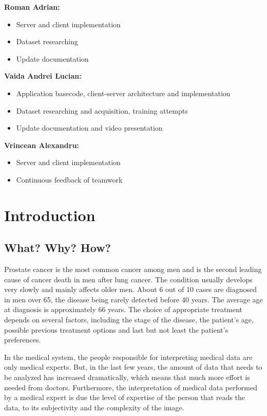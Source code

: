 \documentclass[runningheads,a4paper,11pt]{report}
\begin{document}
\textbf{Roman Adrian:}
\begin{itemize}
	\item Server and client implementation
	\item Dataset researching
	\item Update documentation
\end{itemize}

\textbf{Vaida Andrei Lucian:}
\begin{itemize}
	\item Application basecode, client-server architecture and implementation
	\item Dataset researching and acquisition, training attempts
	\item Update documentation and video presentation
\end{itemize}

\textbf{Vrincean Alexandru:}
\begin{itemize}
	\item Server and client implementation
	\item Continuous feedback of teamwork
\end{itemize}

\newpage



\chapter{Introduction}
\label{chapter:introduction}

\section{What? Why? How?}
\label{section:what}

Prostate cancer is the most common cancer among men and is the second leading cause of cancer death in men after lung cancer. The condition usually develops very slowly and mainly affects older men. About 6 out of 10 cases are diagnosed in men over 65, the disease being rarely detected before 40 years. The average age at diagnosis is approximately 66 years. The choice of appropriate treatment depends on several factors, including the stage of the disease, the patient's age, possible previous treatment options and last but not least the patient's preferences.\cite{reginaMaria}

In the medical system, the people responsible for interpreting medical data are only medical experts. But, in the last few years, the amount of data that needs to be analyzed has increased dramatically, which means that much more effort is needed from doctors. Furthermore, the interpretation of medical data performed by a medical expert is due the level of expertise of the person that reads the data, to its subjectivity and the complexity of the image.
\end{document}
